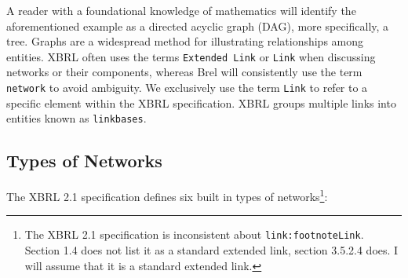 
A reader with a foundational knowledge of mathematics will identify the aforementioned example as a directed acyclic graph (DAG), 
more specifically, a tree.
Graphs are a widespread method for illustrating relationships among entities.
XBRL often uses the terms \texttt{Extended Link} or \texttt{Link} when discussing networks or their components,
whereas Brel will consistently use the term \texttt{network} to avoid ambiguity.
We exclusively use the term \texttt{Link} to refer to a specific element within the XBRL specification.
XBRL groups multiple links into entities known as \texttt{linkbases}.

\subsection{Types of Networks}

The XBRL 2.1 specification defines six built in types of networks\cite{xbrl21_terminology}\footnote{The XBRL 2.1 specification is inconsistent about \texttt{link:footnoteLink}. Section 1.4 does not list it as a standard extended link, section 3.5.2.4 does. I will assume that it is a standard extended link.}:

